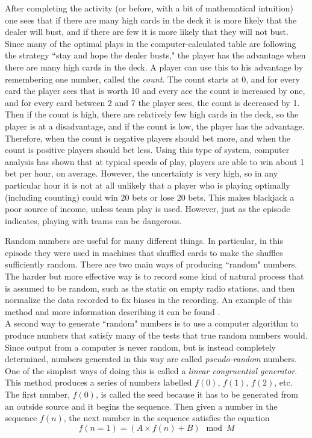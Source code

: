 After completing the activity (or before, with a bit of mathematical intuition) one sees that if there are many high cards in the deck it is more likely that the dealer will bust, and if there are few it is more likely that they will not bust. Since many of the optimal plays in the computer-calculated table are following the strategy ``stay and hope the dealer busts," the player has the advantage when there are many high cards in the deck. A player can use this to his advantage by remembering one number, called the \emph{count}. The count starts at 0, and for every card the player sees that is worth 10 and every ace the count is increased by one, and for every card between 2 and 7 the player sees, the count is decreased by 1. Then if the count is high, there are relatively few high cards in the deck, so the player is at a disadvantage, and if the count is low, the player has the advantage. Therefore, when the count is negative players should bet more, and when the count is positive players should bet less. Using this type of system, computer analysis has shown that at typical speeds of play, players are able to win about 1 bet per hour, on average. However, the uncertainty is very high, so in any particular hour it is not at all unlikely that a player who is playing optimally (including counting) could win 20 bets or lose 20 bets. This makes blackjack a poor source of income, unless team play is used. However, just as the episode indicates, playing with teams can be dangerous. \\


Random numbers are useful for many different things. In particular, in this episode they were used in machines that shuffled cards to make the shuffles sufficiently random. There are two main ways of producing ``random" numbers. The harder but more effective way is to record some kind of natural process that is assumed to be random, such as the static on empty radio stations, and then normalize the data recorded to fix biases in the recording. An example of this method and more information describing it can be found . \\

A second way to generate ``random" numbers is to use a computer algorithm to produce numbers that satisfy many of the tests that true random numbers would. Since output from a computer is never random, but is instead completely determined, numbers generated in this way are called \emph{pseudo-random} numbers. One of the simplest ways of doing this is called a \emph{linear congruential generator}. This method produces a series of numbers labelled $f(0)$, $f(1)$, $f(2)$, etc. The first number, $f(0)$, is called the seed because it has to be generated from an outside source and it begins the sequence. Then given a number in the sequence $f(n)$, the next number in the sequence satisfies the equation 
\[
f(n=1)=(A \times f(n)+B) \mod M
\]


